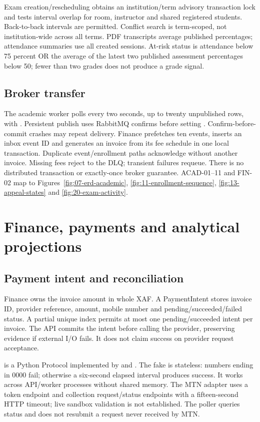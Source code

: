\documentclass[10pt,a4paper]{article}
\begin{document}
Exam creation/rescheduling obtains an institution/term advisory transaction lock
and tests interval overlap for room, instructor and shared registered students.
Back-to-back intervals are permitted. Conflict search is term-scoped, not institution-wide
across all terms. PDF transcripts average published percentages; attendance summaries
use all created sessions. At-risk status is attendance below 75 percent OR the average
of the latest two published assessment percentages below 50; fewer than two grades
does not produce a grade signal.

\subsection{Broker transfer}
The academic worker polls every two seconds, up to twenty unpublished rows,
with . Persistent publish uses RabbitMQ confirms before
setting . Confirm-before-commit crashes may repeat delivery.
Finance prefetches ten events, inserts an inbox event ID and generates an invoice
from its fee schedule in one local transaction. Duplicate event/enrollment paths
acknowledge without another invoice. Missing fees reject to the DLQ; transient
failures requeue. There is no distributed transaction or exactly-once broker guarantee.
ACAD-01--11 and FIN-02 map to Figures~\ref{fig:07-erd-academic},
\ref{fig:11-enrollment-sequence}, \ref{fig:13-appeal-states} and \ref{fig:20-exam-activity}.

\clearpage
\section{Finance, payments and analytical projections}
\subsection{Payment intent and reconciliation}
Finance owns the invoice amount in whole XAF. A PaymentIntent stores invoice ID,
provider reference, amount, mobile number and pending/succeeded/failed status.
A partial unique index permits at most one pending/succeeded intent per invoice.
The API commits the intent before calling the provider, preserving evidence if
external I/O fails. It does not claim success on provider request acceptance.

 is a Python Protocol implemented by
 and . The fake is stateless:
numbers ending in 0000 fail; otherwise a six-second elapsed interval produces
success. It works across API/worker processes without shared memory.
The MTN adapter uses a token endpoint and collection request/status endpoints
with a fifteen-second HTTP timeout; live sandbox validation is not established.
The poller queries status and does not resubmit a request never received by MTN.
\end{document}
